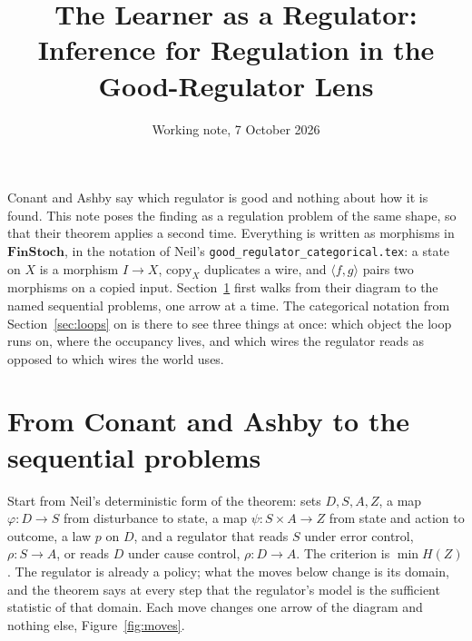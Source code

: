 \documentclass[10pt]{article}
\title{The Learner as a Regulator:\\ Inference for Regulation in the Good-Regulator Lens}
\author{Working note, 7 October 2026}
\date{}
\theoremstyle{plain}
\newcommand{\copym}[1]{\mathrm{copy}_{#1}}
\newcommand{\pair}[2]{\langle #1,#2\rangle}
\begin{document}
\maketitle
\thispagestyle{fancy}

\noindent
Conant and Ashby say which regulator is good and nothing about how it is found.
This note poses the finding as a regulation problem of the same shape, so that their theorem applies a second time.
Everything is written as morphisms in $\mathbf{FinStoch}$, in the notation of Neil's \texttt{good\_regulator\_categorical.tex}: a state on $X$ is a morphism $I \to X$, $\copym{X}$ duplicates a wire, and $\pair{f}{g}$ pairs two morphisms on a copied input.
Section~\ref{sec:chain} first walks from their diagram to the named sequential problems, one arrow at a time.
The categorical notation from Section~\ref{sec:loops} on is there to see three things at once: which object the loop runs on, where the occupancy lives, and which wires the regulator reads as opposed to which wires the world uses.

\section{From Conant and Ashby to the sequential problems}
\label{sec:chain}

Start from Neil's deterministic form of the theorem: sets $D, S, A, Z$, a map $\varphi\colon D \to S$ from disturbance to state, a map $\psi\colon S \times A \to Z$ from state and action to outcome, a law $p$ on $D$, and a regulator that reads $S$ under error control, $\rho\colon S \to A$, or reads $D$ under cause control, $\rho\colon D \to A$.
The criterion is $\min H(Z)$.
The regulator is already a policy; what the moves below change is its domain, and the theorem says at every step that the regulator's model is the sufficient statistic of that domain.
Each move changes one arrow of the diagram and nothing else, Figure~\ref{fig:moves}.
\end{document}
